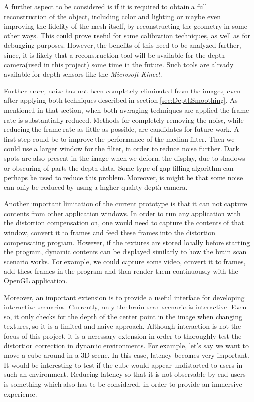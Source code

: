 \documentclass[]{article}
\begin{document}
A further aspect to be considered is if it is required to obtain a full reconstruction of the object, including color and lighting or maybe even improving the fidelity of the mesh itself, by reconstructing the geometry in some other ways. This could prove useful for some calibration techniques, as well as for debugging purposes. However, the benefits of this need to be analyzed further, since, it is likely that a reconstruction tool will be available for the depth camera(used in this project) some time in the future. Such tools are already available for depth sensors like the \textit{Microsoft Kinect}.

Further more, noise has not been completely eliminated from the images, even after applying both techniques described in section \ref{sec:DepthSmoothing}. As mentioned in that section, when both averaging techniques are applied the frame rate is substantially reduced. Methods for completely removing the noise, while reducing the frame rate as little as possible, are candidates for future work. A first step could be to improve the performance of the median filter. Then we could use a larger window for the filter, in order to reduce noise further. Dark spots are also present in the image when we deform the display, due to shadows or  obscuring of parts the depth data. Some type of gap-filling algorithm can perhaps be used to reduce this problem.  Moreover, is might be that some noise can only be reduced by using a higher quality depth camera.

Another important limitation of the current prototype is that it can not capture contents from other application windows. In order to run any application with the distortion compensation on, one would need to capture the contents of that window, convert it to frames and feed these frames into the distortion compensating program. However, if the textures are stored locally before starting the program, dynamic contents can be displayed similarly to how the brain scan scenario works. For example, we could capture some video, convert it to frames, add these frames in the program and then render them continuously with the OpenGL application.

Moreover, an important extension is to provide a useful interface for developing interactive scenarios. Currently, only the brain scan scenario is interactive. Even so, it only checks for the depth of the center point in the image when changing textures, so it is a limited and naive approach. Although interaction is not the focus of this project, it is a necessary extension in order to thoroughly test the distortion correction in dynamic environments. For example, let's say we want to move a cube around in a 3D scene. In this case, latency becomes very important. It would be interesting to test if the cube would appear undistorted to users in such an environment. Reducing latency so that it is not observable by end-users is something which also has to be considered, in order to provide an immersive experience.
\end{document}
